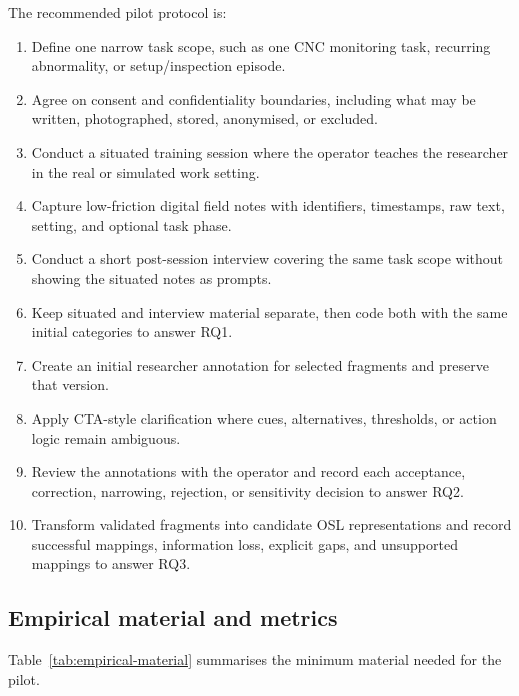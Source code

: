 The recommended pilot protocol is:

\begin{enumerate}
    \item Define one narrow task scope, such as one CNC monitoring task, recurring abnormality, or setup/inspection episode.
    \item Agree on consent and confidentiality boundaries, including what may be written, photographed, stored, anonymised, or excluded.
    \item Conduct a situated training session where the operator teaches the researcher in the real or simulated work setting.
    \item Capture low-friction digital field notes with identifiers, timestamps, raw text, setting, and optional task phase.
    \item Conduct a short post-session interview covering the same task scope without showing the situated notes as prompts.
    \item Keep situated and interview material separate, then code both with the same initial categories to answer RQ1.
    \item Create an initial researcher annotation for selected fragments and preserve that version.
    \item Apply CTA-style clarification where cues, alternatives, thresholds, or action logic remain ambiguous.
    \item Review the annotations with the operator and record each acceptance, correction, narrowing, rejection, or sensitivity decision to answer RQ2.
    \item Transform validated fragments into candidate OSL representations and record successful mappings, information loss, explicit gaps, and unsupported mappings to answer RQ3.
\end{enumerate}

\subsection{Empirical material and metrics}

Table~\ref{tab:empirical-material} summarises the minimum material needed for the pilot.

